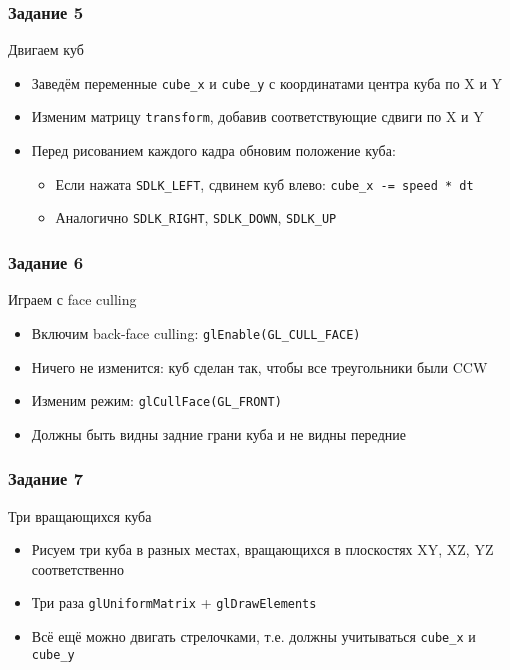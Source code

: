 \documentclass{beamer}
\begin{document}
\begin{frame}[fragile]
\frametitle{Задание 5}
Двигаем куб
\begin{itemize}
\item Заведём переменные \verb|cube_x| и \verb|cube_y| с координатами центра куба по X и Y
\pause
\item Изменим матрицу \verb|transform|, добавив соответствующие сдвиги по X и Y
\pause
\item Перед рисованием каждого кадра обновим положение куба:
\begin{itemize}
\item Если нажата \verb|SDLK_LEFT|, сдвинем куб влево: \verb|cube_x -= speed * dt|
\item Аналогично \verb|SDLK_RIGHT|, \verb|SDLK_DOWN|, \verb|SDLK_UP|
\end{itemize}
\end{itemize}
\end{frame}

\begin{frame}[fragile]
\frametitle{Задание 6}
Играем с face culling
\begin{itemize}
\item Включим back-face culling: \verb|glEnable(GL_CULL_FACE)|
\pause
\item Ничего не изменится: куб сделан так, чтобы все треугольники были CCW
\pause
\item Изменим режим: \verb|glCullFace(GL_FRONT)|
\pause
\item Должны быть видны задние грани куба и не видны передние
\end{itemize}
\end{frame}

\begin{frame}[fragile]
\frametitle{Задание 7}
Три вращающихся куба
\begin{itemize}
\item Рисуем три куба в разных местах, вращающихся в плоскостях XY, XZ, YZ соответственно
\pause
\item Три раза \verb|glUniformMatrix| + \verb|glDrawElements|
\pause
\item Всё ещё можно двигать стрелочками, т.е. должны учитываться \verb|cube_x| и \verb|cube_y|
\end{itemize}
\end{frame}
\end{document}
